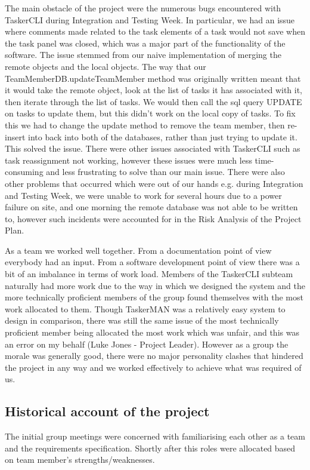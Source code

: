 \documentclass{project}
\begin{document}
The main obstacle of the project were the numerous bugs encountered with TaskerCLI during Integration and Testing Week. In particular, we had an issue where comments made related to the task elements of a task would not save when the task panel was closed, which was a major part of the functionality of the software. The issue stemmed from our naive implementation of merging the remote objects and the local objects. The way that our TeamMemberDB.updateTeamMember method was originally written meant that it would take the remote object, look at the list of tasks it has associated with it, then iterate through the list of tasks. We would then call the sql query UPDATE on tasks to update them, but this didn't work on the local copy of tasks. To fix this we had to change the update method to remove the team member, then re-insert into back into both of the databases, rather than just trying to update it. This solved the issue. There were other issues associated with TaskerCLI such as task reassignment not working, however these issues were much less time-consuming and less frustrating to solve than our main issue. There were also other problems that occurred which were out of our hands e.g. during Integration and Testing Week, we were unable to work for several hours due to a power failure on site, and one morning the remote database was not able to be written to, however such incidents were accounted for in the Risk Analysis of the Project Plan\cite{se.qa.pp}.

As a team we worked well together. From a documentation point of view everybody had an input. From a software development point of view there was a bit of an imbalance in terms of work load. Members of the TaskerCLI subteam naturally had more work due to the way in which we designed the system\cite{se.qa.ds} and the more technically proficient members of the group found themselves with the most work allocated to them. Though TaskerMAN was a relatively easy system to design in comparison, there was still the same issue of the most technically proficient member being allocated the most work which was unfair, and this was an error on my behalf (Luke Jones - Project Leader). However as a group the morale was generally good, there were no major personality clashes that hindered the project in any way and we worked effectively to achieve what was required of us.

\subsection{Historical account of the project}
The initial group meetings were concerned with familiarising each other as a team and the requirements specification. Shortly after this roles were allocated based on team member's strengths/weaknesses. 
\end{document}
